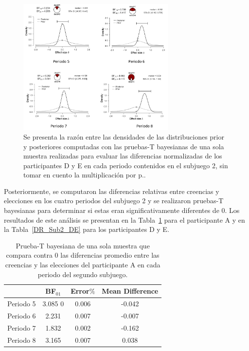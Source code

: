 \begin{figure}[th]
\centering
\includegraphics[width=0.70\textwidth]{Figures/Fig_12} 
\caption[Cambio en el número elegido periodo a periodo.]{Se presenta la razón entre las densidades de las distribuciones prior y posteriores  computadas con las pruebas-T bayesianas de una sola muestra realizadas para evaluar las diferencias normalizadas de los participantes D y E en cada periodo contenidos en el subjuego 2, sin tomar en cuento la multiplicación por p..}
\label{fig:DiferenciasNormalizadas_Subjuego2_DE_NoP}
\end{figure}

Posteriormente, se computaron las diferencias relativas entre creencias y elecciones en los cuatro periodos del subjuego 2 y se realizaron pruebas-T bayesianas para determinar si estas eran significativamente diferentes de $0$. Los resultados de este análisis se presentan en la Tabla~\ref{DR_Sub2_A} para el participante A y en la Tabla~\ref{DR_Sub2_DE} para los participantes D y E.\\

\begin{table}
\caption[Diferencias Relativas en el Subjuego 2, (Participantes A)]{Prueba-T bayesiana de una sola muestra que compara contra 0 las diferencias promedio entre las creencias y las elecciones del participante A en cada periodo del segundo subjuego.}
\label{DR_Sub2_A}
\centering
\begin{tabular}{l | c c c}  %
\toprule
\textbf{} & \textbf{BF$_{01}$} & \textbf{Error$\%$} & \textbf{Mean Difference}\\
\midrule
Periodo 5 & 3.085 0& 0.006 & -0.042 \\
Periodo 6 & 2.231 & 0.007 & -0.007 \\
Periodo 7 & 1.832 & 0.002 & -0.162 \\
Periodo 8 & 3.165 & 0.007 & 0.038 \\
\bottomrule
\end{tabular}
\end{table}

